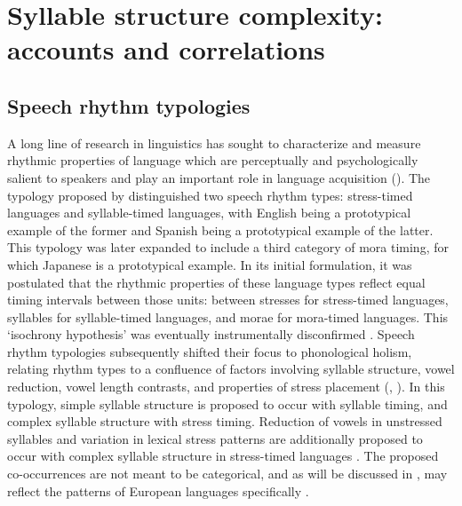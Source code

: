 \section{Syllable structure complexity: accounts and correlations}\label{sec:1.3}
\subsection{Speech rhythm typologies}\label{sec:1.3.1}

  A long line of research in linguistics has sought to characterize and measure rhythmic properties of language which are perceptually and psychologically salient to speakers and play an important role in language acquisition (\citealt{CutlerMehler1993}). The typology proposed by \citet{Pike1945} distinguished two speech rhythm types: stress-timed languages and syllable-timed languages, with English being a prototypical example of the former and Spanish being a prototypical example of the latter. This typology was later expanded to include a third category of mora timing, for which Japanese is a prototypical example. In its initial formulation, it was postulated that the rhythmic properties of these language types reflect equal timing intervals between those units: between stresses for stress-timed languages, syllables for syllable-timed languages, and morae for mora-timed languages. This ‘isochrony hypothesis’ was eventually instrumentally disconfirmed \citep{Roach1982}. Speech rhythm typologies subsequently shifted their  focus to phonological holism, relating rhythm types to a confluence of factors involving syllable structure, vowel reduction, vowel length contrasts, and properties of stress placement (\citealt{Roach1982}, \citealt{Dauer1983}). In this typology, simple syllable structure is proposed to occur with syllable timing, and complex syllable structure with stress timing. Reduction of vowels in unstressed syllables and variation in lexical stress patterns are additionally proposed to occur with complex syllable structure in stress-timed languages \citep{Auer1993}. The proposed co-occurrences are not meant to be categorical, and as will be discussed in , may reflect the patterns of European languages specifically \citep{Schiering2007}.


